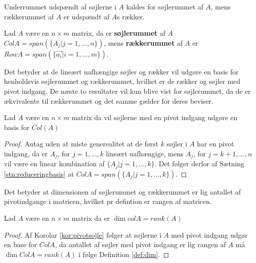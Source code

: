 Underrummet udspændt af søjlerne i $A$ kaldes for søjlerummet af $A$, mens rækkerummet af $A$ er udspændt af $A$s rækker.
\begin{defn}
Lad $A$ være en $n\times m$ matrix, da er \textbf{søjlerummet} af $A$ $Col A = span(\{A_j | j =1,...,n\})$, mens \textbf{rækkerummet} af $A$ er $Row A = span(\{\vec{a_i}|i=1,...,m\})$.
\label{def:sojlerum}
\end{defn} 
Det betyder at de lineært uafhængige søjler og rækker vil udgøre en basis for henholdsvis søjlerummet og rækkerummet, hvilket er de rækker og søjler med pivot indgang. 
De næste to resultater vil kun blive vist for søjlerummet, da de er ækvivalente til rækkerummet og det samme gælder for deres beviser.
\begin{kor}
Lad $A$ være en $n \times m$ matrix da vil søjlerne med en pivot indgang udgøre en basis for $Col (A)$
\label{kor:pivotsojle}
\end{kor}
\begin{proof}
Antag uden at miste generealitet at de først $k$ søjler i $A$ har en pivot indgang, da er $A_j$, for $j=1,...,k$ lineært uafhængige, mens $A_j$, for $j = k+1,...,n$ vil være en linear kombination af $\{A_j | j = 1,...,k\}$. 
Det følger derfor af Sætning \ref{stn:reduceringbasis} at $Col A = span(\{A_j| j=1,...,k\})$.
\end{proof}
Det betyder at dimensionen af søjlerummet og rækkerummet er lig antallet af pivotindgange i matricen, hvilket pr defintion er rangen af matricen.
\begin{kor}
Lad $A$ være en $n\times m $ matrix da er $\dim{col A} = rank (A)$
\end{kor}
\begin{proof}
Af Korolar \ref{kor:pivotsojle} følger at søjlerne i $A$ med pivot indgang udgør en base for $Col A$, da antallet af søjler med pivot indgang er lig rangen af $A$ må $\dim{Col A} = rank (A)$ i følge Definition \ref{def:dim}.
\end{proof}


